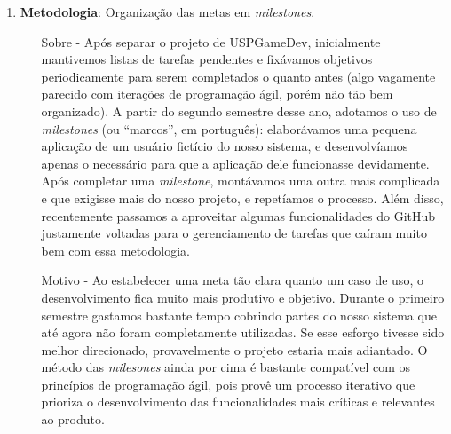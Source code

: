 \begin{enumerate}
    \item \textbf{Metodologia}: Organização das metas em \textit{milestones}.
      \begin{itemize}
        \item[Sobre -] Após separar o projeto de USPGameDev, inicialmente
          mantivemos listas de tarefas pendentes e fixávamos objetivos
          periodicamente para serem completados o quanto antes (algo vagamente
          parecido com iterações de programação ágil, porém não tão bem
          organizado). A partir do segundo semestre desse ano, adotamos o
          uso de \textit{milestones}\footnotemark{} (ou ``marcos'', em português):
          elaborávamos uma pequena aplicação de um usuário fictício do nosso
          sistema, e desenvolvíamos apenas o necessário para que a aplicação
          dele funcionasse devidamente. Após completar uma \textit{milestone},
          montávamos uma outra mais complicada e que exigisse mais do nosso
          projeto, e repetíamos o processo. Além disso, recentemente passamos
          a aproveitar algumas funcionalidades do GitHub justamente voltadas
          para o gerenciamento de tarefas que caíram muito bem com essa
          metodologia.
        \item[Motivo -] Ao estabelecer uma meta tão clara quanto um caso de uso,
          o desenvolvimento fica muito mais produtivo e objetivo. Durante o
          primeiro semestre gastamos bastante tempo cobrindo partes do nosso
          sistema que até agora não foram completamente utilizadas. Se esse
          esforço tivesse sido melhor direcionado, provavelmente o projeto estaria
          mais adiantado. O método das \textit{milesones} ainda por cima é
          bastante compatível com os princípios de programação ágil, pois provê
          um processo iterativo que prioriza o desenvolvimento das funcionalidades
          mais críticas e relevantes ao produto.
      \end{itemize}



\end{enumerate}
